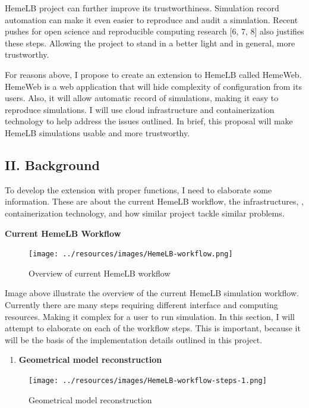 \documentclass[]{article}
\providecommand{\tightlist}{%
  \setlength{\itemsep}{0pt}\setlength{\parskip}{0pt}}
\begin{document}
HemeLB project can further improve its trustworthiness. Simulation
record automation can make it even easier to reproduce and audit a
simulation. Recent pushes for open science and reproducible computing
research {[}6, 7, 8{]} also justifies these steps. Allowing the project
to stand in a better light and in general, more trustworthy.

For reasons above, I propose to create an extension to HemeLB called
HemeWeb. HemeWeb is a web application that will hide complexity of
configuration from its users. Also, it will allow automatic record of
simulations, making it easy to reproduce simulations. I will use cloud
infrastructure and containerization technology to help address the
issues outlined. In brief, this proposal will make HemeLB simulations
usable and more trustworthy.

\subsection{II. Background}\label{ii.-background}

To develop the extension with proper functions, I need to elaborate some
information. These are about the current HemeLB workflow, the
infrastructures, , containerization technology, and how similar project
tackle similar problems.

\textbf{Current HemeLB Workflow}

\begin{figure}[H]
\centering
\texttt{[image: ../resources/images/HemeLB-workflow.png]}
\caption{Overview of current HemeLB workflow}
\end{figure}

Image above illustrate the overview of the current HemeLB simulation
workflow. Currently there are many steps requiring different interface
and computing resources. Making it complex for a user to run simulation.
In this section, I will attempt to elaborate on each of the workflow
steps. This is important, because it will be the basis of the
implementation details outlined in this project.

\begin{enumerate}
\def\labelenumi{\arabic{enumi}.}
\tightlist
\item
  \textbf{Geometrical model reconstruction}
\end{enumerate}

\begin{figure}[H]
\centering
\texttt{[image: ../resources/images/HemeLB-workflow-steps-1.png]}
\caption{Geometrical model reconstruction}
\end{figure}
\end{document}
